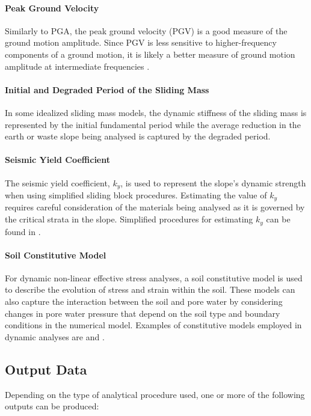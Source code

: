 \paragraph{Peak Ground Velocity}
Similarly to PGA, the peak ground velocity (PGV) is a good measure of the ground motion amplitude. Since PGV is less sensitive to higher-frequency components of a ground motion, it is likely a better measure of ground motion amplitude at intermediate frequencies \citep{kramer1996geotechnical}.

\paragraph{Initial and Degraded Period of the Sliding Mass}
In some idealized sliding mass models, the dynamic stiffness of the sliding mass is represented by the initial fundamental period while the average reduction in the earth or waste slope being analysed is captured by the degraded period.

\paragraph{Seismic Yield Coefficient}
The seismic yield coefficient, $k_y$, is used to represent the slope's dynamic strength when using simplified sliding block procedures. Estimating the value of $k_y$ requires careful consideration of the materials being analysed as it is governed by the critical strata in the slope. Simplified procedures for estimating $k_y$ can be found in \cite{bray1998simplified}.

\paragraph{Soil Constitutive Model}
For dynamic non-linear effective stress analyses, a soil constitutive model is used to describe the evolution of stress and strain within the soil. These models can also capture the interaction between the soil and pore water by considering changes in pore water pressure that depend on the soil type and boundary conditions in the numerical model. Examples of constitutive models employed in dynamic analyses are \cite{yang2003computational, byrne2004numerical, boulanger2017pm4sand} and \cite{boulanger2018pm4silt}.

\subsection{Output Data}
\label{subsec:eq_landslide_output}
Depending on the type of analytical procedure used, one or more of the following outputs can be produced:\\[0.5em]

